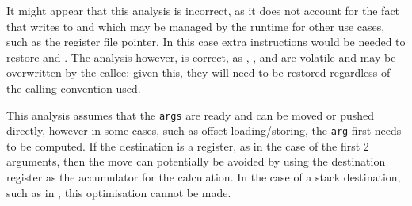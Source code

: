 It might appear that this analysis is incorrect, as it does not account for the fact that  writes to  and  which may be managed by the runtime for other use cases, such as the register file pointer. In this case extra instructions would be needed to restore  and . The analysis however, is correct, as , , and  are volatile \cite{msvc-registers} and may be overwritten by the callee: given this, they will need to be restored regardless of the calling convention used.

This analysis assumes that the \texttt{args} are ready and can be moved or pushed directly, however in some cases, such as offset loading/storing, the \texttt{arg} first needs to be computed. If the destination is a register, as in the case of the first 2  arguments, then the move can potentially be avoided by using the destination register as the accumulator for the calculation. In the case of a stack destination, such as in , this optimisation cannot be made.
